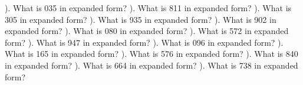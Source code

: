 \documentclass{article}%
\begin{document}
). What is 035 in expanded form?%
\newline%
\newline%
). What is 811 in expanded form?%
\newline%
\newline%
). What is 305 in expanded form?%
\newline%
\newline%
). What is 935 in expanded form?%
\newline%
\newline%
). What is 902 in expanded form?%
\newline%
\newline%
). What is 080 in expanded form?%
\newline%
\newline%
). What is 572 in expanded form?%
\newline%
\newline%
). What is 947 in expanded form?%
\newline%
\newline%
). What is 096 in expanded form?%
\newline%
\newline%
). What is 165 in expanded form?%
\newline%
\newline%
). What is 576 in expanded form?%
\newline%
\newline%
). What is 840 in expanded form?%
\newline%
\newline%
). What is 664 in expanded form?%
\newline%
\newline%
). What is 738 in expanded form?%
\newline%
\newline%
\end{document}
